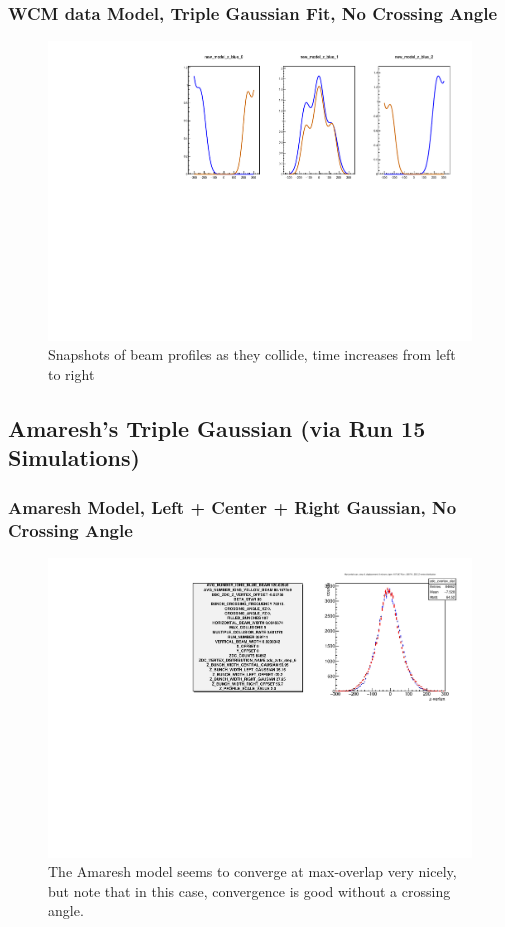 \begin{frame}
\frametitle{WCM data Model, Triple Gaussian Fit, No Crossing Angle}
\begin{figure}
\begin{center}
\includegraphics[width=\linewidth]{../OverlapTest/figs/359711_model2_noangle_zprofile.pdf}
\end{center}
\caption{Snapshots of beam profiles as they collide, time increases from left to right }
\label{fig:359711_model2_noangle_zprofile}
\end{figure}
\end{frame}


\subsection{ Amaresh's Triple Gaussian (via Run 15 Simulations) }
\begin{frame}
\frametitle{Amaresh Model, Left + Center + Right Gaussian, No Crossing Angle }
\begin{figure}
\begin{center}
\includegraphics[width=\linewidth]{../OverlapTest/figs/359711_model1_angle_vertex.pdf}
\end{center}
\caption{The Amaresh model seems to converge at max-overlap very nicely, but
note that in this case, convergence is good without a crossing angle. }
\label{fig:359711_model1_angle_vertex}
\end{figure}
\end{frame}


